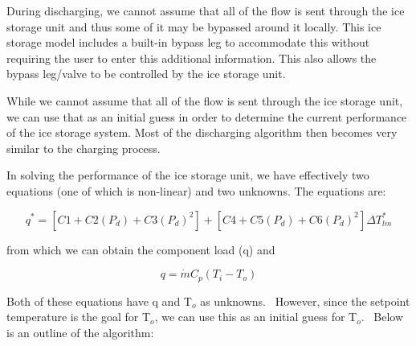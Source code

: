 During discharging, we cannot assume that all of the flow is sent through the ice storage unit and thus some of it may be bypassed around it locally. This ice storage model includes a built-in bypass leg to accommodate this without requiring the user to enter this additional information. This also allows the bypass leg/valve to be controlled by the ice storage unit.

While we cannot assume that all of the flow is sent through the ice storage unit, we can use that as an initial guess in order to determine the current performance of the ice storage system. Most of the discharging algorithm then becomes very similar to the charging process.

In solving the performance of the ice storage unit, we have effectively two equations (one of which is non-linear) and two unknowns. The equations are:

\begin{equation}
{q^*} = \left[ {C1 + C2\left( {{P_d}} \right) + C3{{\left( {{P_d}} \right)}^2}} \right] + \left[ {C4 + C5\left( {{P_d}} \right) + C6{{\left( {{P_d}} \right)}^2}} \right]\Delta T_{lm}^*
\end{equation}

from which we can obtain the component load (q) and

\begin{equation}
q = \dot m{C_p}\left( {{T_i} - {T_o}} \right)
\end{equation}

Both of these equations have q and T\(_{o}\) as unknowns.~ However, since the setpoint temperature is the goal for T\(_{o}\), we can use this as an initial guess for T\(_{o}\).~ Below is an outline of the algorithm:

